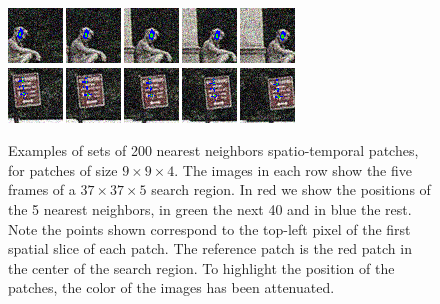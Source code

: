 \documentclass[10pt, journal, twocolumn, final, a4paper]{IEEEtran}
\begin{document}
\begin{figure}[htpb!]
	\centering
	\includegraphics[width = .8\textwidth]{figs/patch_groups/patch_group_bus_045_085_012_s40_wx37_wt2_sx9_st4_r040_n200_coor.png}\\
	\vspace{.2cm}
	\includegraphics[width = .8\textwidth]{figs/patch_groups/patch_group_bus_255_056_010_s40_wx37_wt2_sx9_st4_r040_n200_coor.png}
	\caption{Examples of sets of 200 nearest neighbors spatio-temporal patches,
	for patches of size $9\times 9\times 4$.
	The images in each row show the five frames of a $37\times37\times5$ search region. 
	In red we show the positions of the 5 nearest neighbors, in green the next 40 and in blue the rest.
	Note the points shown correspond to the top-left pixel of the first spatial
	slice of each patch.
	The reference patch is the red patch in the center of the search region. To highlight the
	position of the patches, the color of the images has been attenuated.}
	\label{fig:patch_groups_pos}
\end{figure}
\end{document}
